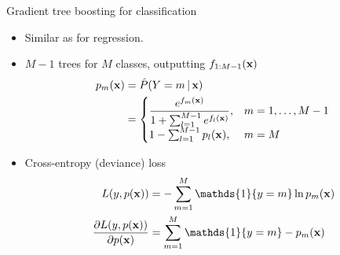 \documentclass[handout]{beamer}
\renewcommand{\indFun}{\ensuremath{\mathds{1}}}
\begin{document}
\begin{frame}{Gradient tree boosting for classification}
\begin{itemize}
	\item Similar as for regression.
	
	\item $ M-1 $ trees for $ M $ classes, outputting $ f_{1:{M-1}}(\mathrm{\mathbf{x}}) $
	\begin{align*}
		p_m(\mathrm{\mathbf{x}}) &= \hat P(Y = m\,|\, \mathrm{\mathbf{x}}) 
		\\
		&= \begin{cases}
			\dfrac{e^{f_m(\mathrm{\mathbf{x}})}}{1+\sum_{l=1}^{M-1} e^{f_l(\mathrm{\mathbf{x}})}},
				& m = 1, \ldots, M-1
			\\
			1 - \sum_{l=1}^{M-1} p_l(\mathrm{\mathbf{x}}), & m = M
		\end{cases}
	\end{align*}
	
	\item Cross-entropy (deviance) loss
	\begin{align*}
		L(y, p(\mv x)) &= - \sum_{m=1}^{M} \indFun\{ y = m \} \ln p_m(\mv x)
		\\
		\frac{\partial L(y, p(\mv x))}{\partial p(\mv x)}
		&= \sum_{m=1}^{M} \indFun\{ y = m \} - p_m(\mv x)
	\end{align*}
\end{itemize}
\end{frame}
\end{document}
